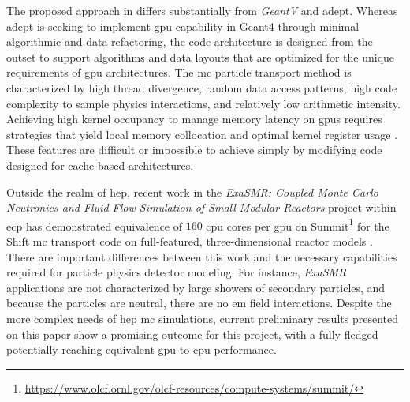 The proposed approach in \celeritas differs substantially from \emph{GeantV} and
\acs{adept}. Whereas \acs{adept} is seeking to implement \ac{gpu} capability in
Geant4 through minimal algorithmic and data refactoring, the \celeritas code
architecture is designed from the outset to support algorithms and data layouts
that are optimized for the unique requirements of \ac{gpu} architectures. The
\ac{mc} particle transport method is characterized by high thread divergence,
random data access patterns, high code complexity to sample physics
interactions, and relatively low arithmetic intensity.  Achieving high kernel
occupancy to manage memory latency on \acp{gpu} requires strategies that yield
local memory collocation and optimal kernel register usage
\cite{hamilton_continuous-energy_2019}.  These features are difficult or
impossible to achieve simply by modifying code designed for cache-based
architectures.

Outside the realm of \ac{hep}, recent work in the \emph{ExaSMR: Coupled Monte
Carlo Neutronics and Fluid Flow Simulation of Small Modular Reactors} project
within \ac{ecp} has demonstrated equivalence of $160$ \ac{cpu} cores per
\ac{gpu} on
Summit\footnote {
    \url{https://www.olcf.ornl.gov/olcf-resources/compute-systems/summit/}
} for the Shift \ac{mc} transport code on full-featured, three-dimensional
reactor models \cite{hamilton_continuous-energy_2019}. There are important
differences between this work and the necessary capabilities required for
particle physics detector modeling. For instance, \emph{ExaSMR} applications are
not characterized by large showers of secondary particles, and because the
particles are neutral, there are no \ac{em} field interactions. Despite the more
complex needs of \ac{hep} \ac{mc} simulations, current preliminary results
presented on this paper show a promising outcome for this project, with a fully
fledged \celeritas potentially reaching equivalent \ac{gpu}-to-\ac{cpu}
performance.

